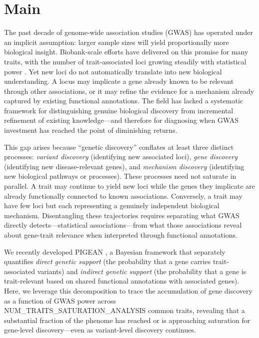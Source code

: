 \section{Main}\label{sec:introduction}

The past decade of genome-wide association studies (GWAS) has operated under an implicit assumption: larger sample sizes will yield proportionally more biological insight. Biobank-scale efforts have delivered on this promise for many traits, with the number of trait-associated loci growing steadily with statistical power \cite{abdellaoui_15_2023}. Yet new loci do not automatically translate into new biological understanding. A locus may implicate a gene already known to be relevant through other associations, or it may refine the evidence for a mechanism already captured by existing functional annotations. The field has lacked a systematic framework for distinguishing genuine biological discovery from incremental refinement of existing knowledge---and therefore for diagnosing when GWAS investment has reached the point of diminishing returns.

This gap arises because ``genetic discovery'' conflates at least three distinct processes: \textit{variant discovery} (identifying new associated loci), \textit{gene discovery} (identifying new disease-relevant genes), and \textit{mechanism discovery} (identifying new biological pathways or processes). These processes need not saturate in parallel. A trait may continue to yield new loci while the genes they implicate are already functionally connected to known associations. Conversely, a trait may have few loci but each representing a genuinely independent biological mechanism. Disentangling these trajectories requires separating what GWAS directly detects---statistical associations---from what those associations reveal about gene-trait relevance when interpreted through functional annotations.

We recently developed PIGEAN \cite{}, a Bayesian framework that separately quantifies \textit{direct genetic support} (the probability that a gene carries trait-associated variants) and \textit{indirect genetic support} (the probability that a gene is trait-relevant based on shared functional annotations with associated genes). Here, we leverage this decomposition to trace the accumulation of gene discovery as a function of GWAS power across {{NUM_TRAITS_SATURATION_ANALYSIS}} common traits, revealing that a substantial fraction of the phenome has reached or is approaching saturation for gene-level discovery---even as variant-level discovery continues.
